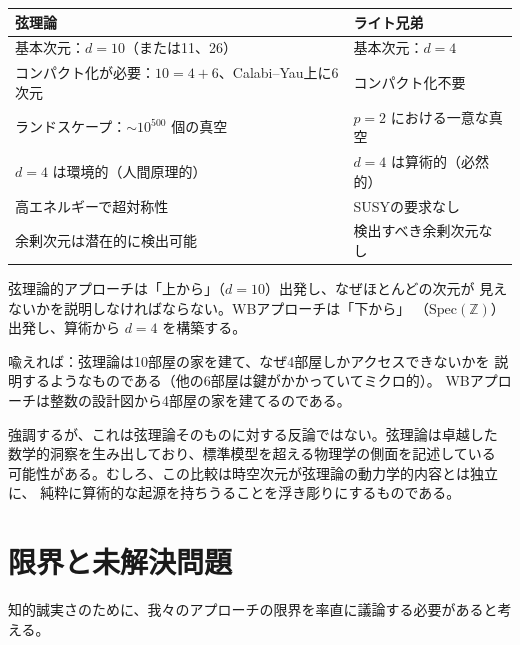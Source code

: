 \documentclass[12pt,a4paper]{article}
\theoremstyle{definition}
\newcommand{\Spec}{\mathrm{Spec}}
\newcommand{\ZZ}{\mathbb{Z}}
\begin{document}
\begin{center}
\begin{tabular}{p{5.5cm}p{5.5cm}}
\toprule
\textbf{弦理論} & \textbf{ライト兄弟} \\
\midrule
基本次元：$d = 10$（または11、26） &
基本次元：$d = 4$ \\
\addlinespace
コンパクト化が必要：$10 = 4 + 6$、Calabi--Yau上に6次元 &
コンパクト化不要 \\
\addlinespace
ランドスケープ：$\sim 10^{500}$ 個の真空 &
$p=2$ における一意な真空 \\
\addlinespace
$d=4$ は環境的（人間原理的） &
$d=4$ は算術的（必然的）\\
\addlinespace
高エネルギーで超対称性 &
SUSYの要求なし \\
\addlinespace
余剰次元は潜在的に検出可能 &
検出すべき余剰次元なし \\
\bottomrule
\end{tabular}
\end{center}

弦理論的アプローチは「上から」（$d=10$）出発し、なぜほとんどの次元が
見えないかを説明しなければならない。WBアプローチは「下から」
（$\Spec(\ZZ)$）出発し、算術から $d=4$ を構築する。

喩えれば：弦理論は10部屋の家を建て、なぜ4部屋しかアクセスできないかを
説明するようなものである（他の6部屋は鍵がかかっていてミクロ的）。
WBアプローチは整数の設計図から4部屋の家を建てるのである。

強調するが、これは弦理論そのものに対する反論ではない。弦理論は卓越した
数学的洞察を生み出しており、標準模型を超える物理学の側面を記述している
可能性がある。むしろ、この比較は時空次元が弦理論の動力学的内容とは独立に、
純粋に算術的な起源を持ちうることを浮き彫りにするものである。

\section{限界と未解決問題}\label{sec:limitations}

知的誠実さのために、我々のアプローチの限界を率直に議論する必要があると考える。
\end{document}
